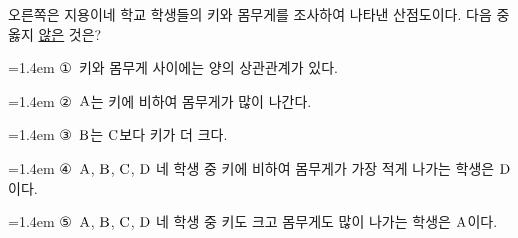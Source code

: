 \noindent\begin{minipage}[t]{0.58\linewidth}\vspace{0pt}\raggedright 오른쪽은 지용이네 학교 학생들의 키와 몸무게를 조사하여 나타낸 산점도이다. 다음 중 옳지 \underline{않은} 것은?\end{minipage}\hfill\begin{minipage}[t]{0.4\linewidth}\vspace{0pt}\centering \resizebox{\ifdim\width>\linewidth\linewidth\else\width\fi}{!}{}\end{minipage}\par
\par\medskip\par\noindent\hangindent=1.4em {\small ①}\ 키와 몸무게 사이에는 양의 상관관계가 있다.\par\noindent\hangindent=1.4em {\small ②}\ $\mathrm{A}$는 키에 비하여 몸무게가 많이 나간다.\par\noindent\hangindent=1.4em {\small ③}\ $\mathrm{B}$는 $\mathrm{C}$보다 키가 더 크다.\par\noindent\hangindent=1.4em {\small ④}\ $\mathrm{A}$, $\mathrm{B}$, $\mathrm{C}$, $\mathrm{D}$ 네 학생 중 키에 비하여 몸무게가 가장 적게 나가는 학생은 $\mathrm{D}$이다.\par\noindent\hangindent=1.4em {\small ⑤}\ $\mathrm{A}$, $\mathrm{B}$, $\mathrm{C}$, $\mathrm{D}$ 네 학생 중 키도 크고 몸무게도 많이 나가는 학생은 $\mathrm{A}$이다.\par\medskip

